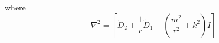 \documentclass{article}
\begin{document}
where
\begin{equation}
 \nabla^{2} = \left[\tilde{D}_{2} + \frac{1}{r}\tilde{D}_{1} - \left( \frac{m^{2}}{r^{2}} + k^{2}\right)I\right]
\end{equation}







 \if@openright\cleardoublepage\else\clearpage\fi
 \cleardoublepage
 \pagestyle{empty}
\end{document}
